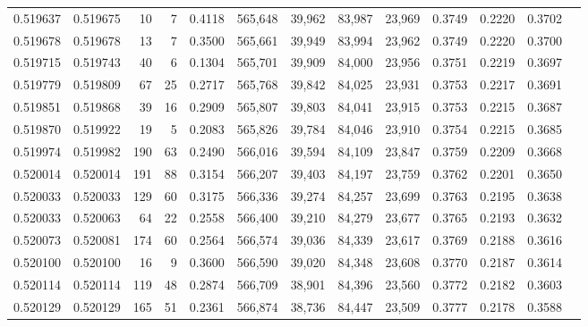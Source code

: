 \begin{tabular}{rrrrrrrrrrrrr}
0.519637 & 0.519675 &    10 &     7 &                                     0.4118 & 565,648 &  39,962 &  83,987 &  23,969 & 0.3749 & 0.2220 & 0.3702 \\
0.519678 & 0.519678 &    13 &     7 &                                     0.3500 & 565,661 &  39,949 &  83,994 &  23,962 & 0.3749 & 0.2220 & 0.3700 \\
0.519715 & 0.519743 &    40 &     6 &                                     0.1304 & 565,701 &  39,909 &  84,000 &  23,956 & 0.3751 & 0.2219 & 0.3697 \\
0.519779 & 0.519809 &    67 &    25 &                                     0.2717 & 565,768 &  39,842 &  84,025 &  23,931 & 0.3753 & 0.2217 & 0.3691 \\
0.519851 & 0.519868 &    39 &    16 &                                     0.2909 & 565,807 &  39,803 &  84,041 &  23,915 & 0.3753 & 0.2215 & 0.3687 \\
0.519870 & 0.519922 &    19 &     5 &                                     0.2083 & 565,826 &  39,784 &  84,046 &  23,910 & 0.3754 & 0.2215 & 0.3685 \\
0.519974 & 0.519982 &   190 &    63 &                                     0.2490 & 566,016 &  39,594 &  84,109 &  23,847 & 0.3759 & 0.2209 & 0.3668 \\
0.520014 & 0.520014 &   191 &    88 &                                     0.3154 & 566,207 &  39,403 &  84,197 &  23,759 & 0.3762 & 0.2201 & 0.3650 \\
0.520033 & 0.520033 &   129 &    60 &                                     0.3175 & 566,336 &  39,274 &  84,257 &  23,699 & 0.3763 & 0.2195 & 0.3638 \\
0.520033 & 0.520063 &    64 &    22 &                                     0.2558 & 566,400 &  39,210 &  84,279 &  23,677 & 0.3765 & 0.2193 & 0.3632 \\
0.520073 & 0.520081 &   174 &    60 &                                     0.2564 & 566,574 &  39,036 &  84,339 &  23,617 & 0.3769 & 0.2188 & 0.3616 \\
0.520100 & 0.520100 &    16 &     9 &                                     0.3600 & 566,590 &  39,020 &  84,348 &  23,608 & 0.3770 & 0.2187 & 0.3614 \\
0.520114 & 0.520114 &   119 &    48 &                                     0.2874 & 566,709 &  38,901 &  84,396 &  23,560 & 0.3772 & 0.2182 & 0.3603 \\
0.520129 & 0.520129 &   165 &    51 &                                     0.2361 & 566,874 &  38,736 &  84,447 &  23,509 & 0.3777 & 0.2178 & 0.3588 \\

\end{tabular}
